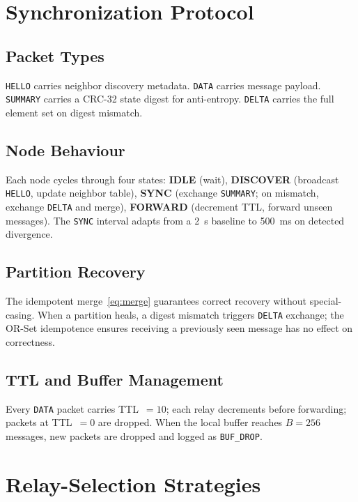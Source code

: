 \documentclass[conference]{IEEEtran}
\begin{document}
\section{Synchronization Protocol}
\label{sec:protocol}

\subsection{Packet Types}
\texttt{HELLO} carries neighbor discovery metadata.
\texttt{DATA} carries message payload.
\texttt{SUMMARY} carries a CRC-32 state digest for anti-entropy.
\texttt{DELTA} carries the full element set on digest mismatch.

\subsection{Node Behaviour}
Each node cycles through four states:
\textbf{IDLE} (wait), \textbf{DISCOVER} (broadcast \texttt{HELLO}, update
neighbor table), \textbf{SYNC} (exchange \texttt{SUMMARY}; on mismatch, exchange
\texttt{DELTA} and merge), \textbf{FORWARD} (decrement TTL, forward unseen messages).
The \texttt{SYNC} interval adapts from a 2~s baseline to 500~ms on detected
divergence.

\subsection{Partition Recovery}
The idempotent merge~\eqref{eq:merge} guarantees correct recovery without
special-casing.  When a partition heals, a digest mismatch triggers \texttt{DELTA}
exchange; the OR-Set idempotence ensures receiving a previously seen message has
no effect on correctness.

\subsection{TTL and Buffer Management}
Every \texttt{DATA} packet carries TTL~$=10$; each relay decrements before
forwarding; packets at TTL~$=0$ are dropped.  When the local buffer reaches
$B=256$ messages, new packets are dropped and logged as \texttt{BUF\_DROP}.

\section{Relay-Selection Strategies}
\label{sec:ai}
\end{document}
